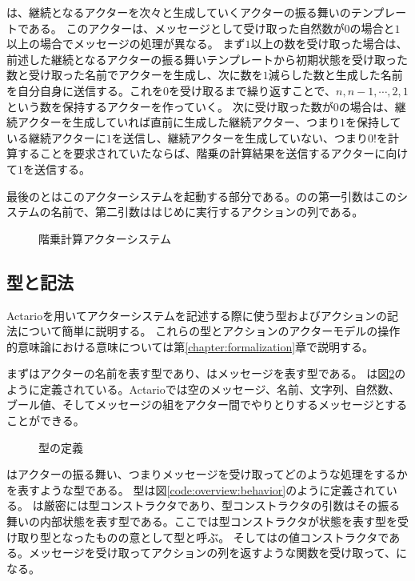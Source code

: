 は、継続となるアクターを次々と生成していくアクターの振る舞いのテンプレートである。
このアクターは、メッセージとして受け取った自然数が$0$の場合と$1$以上の場合でメッセージの処理が異なる。
まず$1$以上の数を受け取った場合は、前述した継続となるアクターの振る舞いテンプレートから初期状態を受け取った数と受け取った名前でアクターを生成し、次に数を$1$減らした数と生成した名前を自分自身に送信する。これを$0$を受け取るまで繰り返すことで、$n, n - 1, \cdots, 2, 1$ という数を保持するアクターを作っていく。
次に受け取った数が$0$の場合は、継続アクターを生成していれば直前に生成した継続アクター、つまり$1$を保持している継続アクターに$1$を送信し、継続アクターを生成していない、つまり$0!$を計算することを要求されていたならば、階乗の計算結果を送信するアクターに向けて$1$を送信する。

最後のとはこのアクターシステムを起動する部分である。のの第一引数はこのシステムの名前で、第二引数ははじめに実行するアクションの列である。

\begin{figure}[tp]
  
  \label{code:overview:fact-impl}
  \caption{階乗計算アクターシステム}
\end{figure}

\subsection{型と記法}

Actarioを用いてアクターシステムを記述する際に使う型およびアクションの記法について簡単に説明する。
これらの型とアクションのアクターモデルの操作的意味論における意味については第\ref{chapter:formalization}章で説明する。

まずはアクターの名前を表す型であり、はメッセージを表す型である。
は図\ref{code:overview:message}のように定義されている。Actarioでは空のメッセージ、名前、文字列、自然数、ブール値、そしてメッセージの組をアクター間でやりとりするメッセージとすることができる。

\begin{figure}
  
  \label{code:overview:message}
  \caption{型の定義}
\end{figure}

はアクターの振る舞い、つまりメッセージを受け取ってどのような処理をするかを表すような型である。
型は図\ref{code:overview:behavior}のように定義されている。
は厳密には型コンストラクタであり、型コンストラクタの引数はその振る舞いの内部状態を表す型である。ここでは型コンストラクタが状態を表す型を受け取り型となったものの意として型と呼ぶ。
そしてはの値コンストラクタである。メッセージを受け取ってアクションの列を返すような関数を受け取って、になる。

